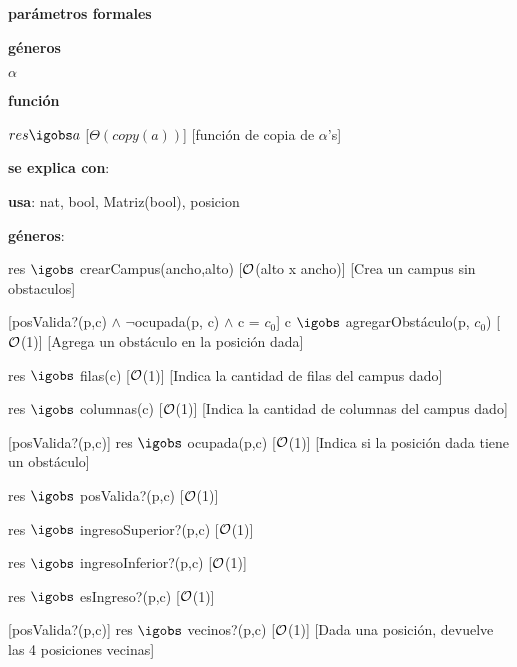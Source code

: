 \begin{Interfaz}
	\textbf{parámetros formales}\parindent\\
	\parbox{1.7cm}{\textbf{géneros}} $\alpha$\\
	\parbox[t]{1.7cm}{\textbf{función}}\parbox[t]{\textwidth-2\parindent-1.7cm}{%
	    	{$res \igobs a$}
		[$\Theta(copy(a))$]
		[función de copia de $\alpha$'s]
	}
  
	\textbf{se explica con}: 
	
	\textbf{usa}: nat, bool, Matriz(bool), posicion
	
	\textbf{géneros}: 
	

	{res $\igobs$ crearCampus(ancho,alto)}
	[$\mathcal{O}$(alto x ancho)]
	[Crea un campus sin obstaculos]
	
	[posValida?(p,c) $\land$ $\neg$ocupada(p, c) $\land$ c = $c_{0}$]
	{c $\igobs$ agregarObstáculo(p, $c_{0}$)}
	[$\mathcal{O}$(1)]
	[Agrega un obstáculo en la posición dada]
	
	{res $\igobs$ filas(c)}
	[$\mathcal{O}$(1)]
	[Indica la cantidad de filas del campus dado]
	
	{res $\igobs$ columnas(c)}
	[$\mathcal{O}$(1)]
	[Indica la cantidad de columnas del campus dado]	
	
	[posValida?(p,c)]
	{res $\igobs$ ocupada(p,c)}
	[$\mathcal{O}$(1)]
	[Indica si la posición dada tiene un obstáculo]
	
	{res $\igobs$ posValida?(p,c)}
	[$\mathcal{O}$(1)]
	
	{res $\igobs$ ingresoSuperior?(p,c)}
	[$\mathcal{O}$(1)]
	
	{res $\igobs$ ingresoInferior?(p,c)}
	[$\mathcal{O}$(1)]
	
	{res $\igobs$ esIngreso?(p,c)}
	[$\mathcal{O}$(1)]
	
	[posValida?(p,c)]
	{res $\igobs$ vecinos?(p,c)}
	[$\mathcal{O}$(1)]
	[Dada una posición, devuelve las 4 posiciones vecinas]
		

\end{Interfaz}
